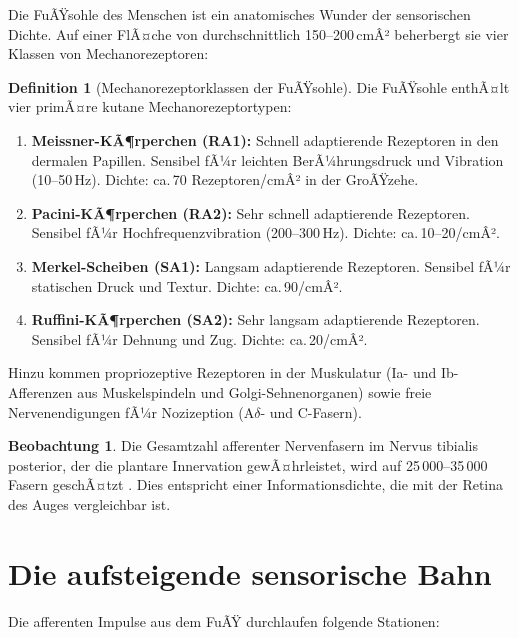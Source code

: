﻿\documentclass[12pt,a4paper]{report}
\theoremstyle{plain}
\theoremstyle{definition}
\newtheorem{definition}[theorem]{Definition}
\newtheorem{beobachtung}[theorem]{Beobachtung}
\theoremstyle{remark}
\begin{document}
Die FuÃŸsohle des Menschen ist ein anatomisches Wunder der sensorischen
Dichte. Auf einer FlÃ¤che von durchschnittlich 150--200\,cmÂ² beherbergt sie
vier Klassen von Mechanorezeptoren:

\begin{definition}[Mechanorezeptorklassen der FuÃŸsohle]
Die FuÃŸsohle enthÃ¤lt vier primÃ¤re kutane Mechanorezeptortypen:
\begin{enumerate}
\item \textbf{Meissner-KÃ¶rperchen (RA1):} Schnell adaptierende Rezeptoren in
  den dermalen Papillen. Sensibel fÃ¼r leichten BerÃ¼hrungsdruck und
  Vibration (10--50\,Hz). Dichte: ca.\,70 Rezeptoren/cmÂ² in der GroÃŸzehe.
\item \textbf{Pacini-KÃ¶rperchen (RA2):} Sehr schnell adaptierende Rezeptoren.
  Sensibel fÃ¼r Hochfrequenzvibration (200--300\,Hz). Dichte: ca.\,10--20/cmÂ².
\item \textbf{Merkel-Scheiben (SA1):} Langsam adaptierende Rezeptoren.
  Sensibel fÃ¼r statischen Druck und Textur. Dichte: ca.\,90/cmÂ².
\item \textbf{Ruffini-KÃ¶rperchen (SA2):} Sehr langsam adaptierende Rezeptoren.
  Sensibel fÃ¼r Dehnung und Zug. Dichte: ca.\,20/cmÂ².
\end{enumerate}
\end{definition}

Hinzu kommen propriozeptive Rezeptoren in der Muskulatur (Ia- und
Ib-Afferenzen aus Muskelspindeln und Golgi-Sehnenorganen) sowie freie
Nervenendigungen fÃ¼r Nozizeption (A$\delta$- und C-Fasern).

\begin{beobachtung}
Die Gesamtzahl afferenter Nervenfasern im Nervus tibialis posterior, der
die plantare Innervation gewÃ¤hrleistet, wird auf 25\,000--35\,000 Fasern
geschÃ¤tzt \cite{vallbo1979}. Dies entspricht einer Informationsdichte, die
mit der Retina des Auges vergleichbar ist.
\end{beobachtung}

\section{Die aufsteigende sensorische Bahn}

Die afferenten Impulse aus dem FuÃŸ durchlaufen folgende Stationen:
\end{document}
